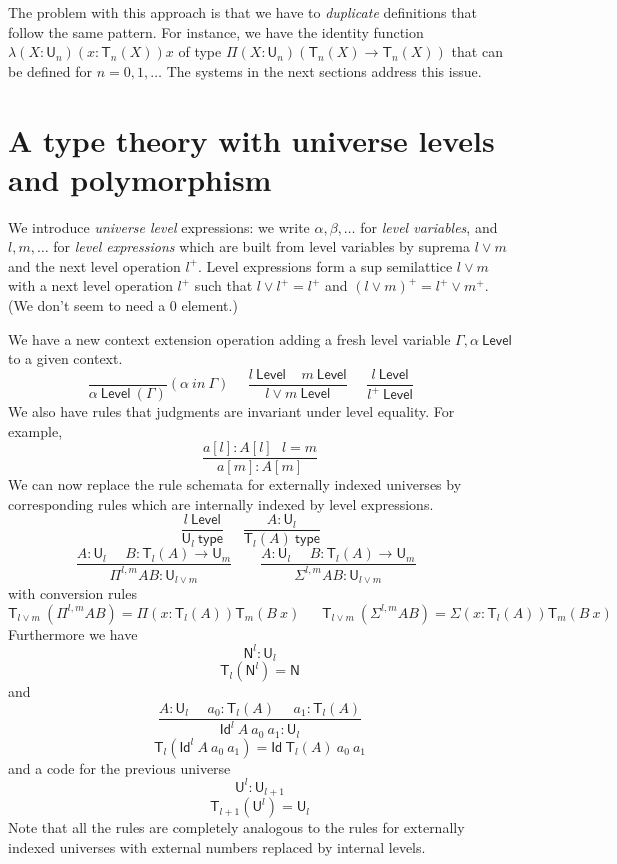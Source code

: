 \documentclass[11pt,a4paper]{article}
\newcommand{\Id}{\mathsf{Id}}
\def\NN{\mathsf{N}}
\def\UU{\mathsf{U}}
\def\Level{\mathsf{Level}}
\newcommand{\type}{\mathsf{type}}
\newcommand{\T}{\mathsf{T}}
\begin{document}
The problem with this approach is that we have to {\em duplicate} definitions that follow
the same pattern. For instance, we have the identity function $\lambda (X:\UU_n)(x:\T_n(X))x$
of type $\Pi (X:\UU_n)(\T_n(X)\rightarrow \T_n(X))$ that can be defined for $n = 0,1,\dots$
The systems in the next sections address this issue.

\section{A type theory with universe levels and polymorphism }\label{internal}

We introduce {\em universe level} expressions: we write $\alpha,\beta,\dots$
for {\em level variables}, and $l,m,\dots$ for {\em level expressions} which are built from level variables
by suprema $l \vee m$ and the next level operation $l^+$.
Level expressions form a sup semilattice $l\vee m$
with a next level operation $l^+$ such that $l \vee l^+ = l^+$
and $(l\vee m)^+ = l^+\vee m^+$. (We don't seem to need a $0$ element.)

We have a new context extension operation adding a fresh level variable $\Gamma,\alpha~\Level$
to a given context.
$$
\frac{}{\alpha~\Level~(\Gamma)}(\alpha~in~\Gamma)~~~~~~
\frac{l~\Level~~~~~m~\Level}{l\vee m~\Level}~~~~~~
\frac{l~\Level}{l^+~\Level}~~~~~~
$$
We also have rules that judgments are invariant under level equality. For example,
$$
\frac{a[l] : A[l]\ \ \ l = m}
{a[m] : A[m]}
$$
We can now replace the rule schemata for externally indexed universes by corresponding rules which are internally indexed by level expressions.
$$
\frac{l~\Level}{\UU_{l}~\type}~~~~~~
\frac{A:\UU_{l}}{\T_{l}(A)~\type}~~~~~~
$$
$$
\frac{A:\UU_{l}~~~~~~B:\T_{l}(A)\rightarrow \UU_{m}}
     {\Pi^{l,m} A B:\UU_{l\vee m}}~~~~~~~~~
\frac{A:\UU_{l}~~~~~~B:\T_{l}(A)\rightarrow \UU_{m}}
     {\Sigma^{l,m} A B:\UU_{l\vee m}}~~~~~~~~~
$$
with conversion rules
$$
\T_{l\vee m}~(\Pi^{l,m} A B) = \Pi (x:\T_{l}(A)) \T_{m}(B~x)~~~~~~~
\T_{l\vee m}~(\Sigma^{l,m} A B) = \Sigma (x:\T_{l}(A)) \T_{m}(B~x)~~~~~~~
$$
Furthermore we have $$\NN^{l}:\UU_{l}$$
$$\T_{l}(\NN^{l}) = \NN$$
and
$$
\frac{A:\UU_l~~~~~~a_0:\T_l(A)~~~~~~a_1:\T_l(A)}
{\Id^l~A~a_0~a_1:\UU_l}
$$
$$\T_l(\Id^l~A~a_0~a_1) = \Id~\T_l(A)~a_0~a_1$$
and a code for the previous universe
$${\UU^{l}}:\UU_{l + 1}$$
$$\T_{l + 1}({\UU^{l}}) = \UU_{l}$$
Note that all the rules are completely analogous to the rules for externally indexed universes with external numbers replaced by internal levels.
%
%
%
%
%
%
%
\end{document}
